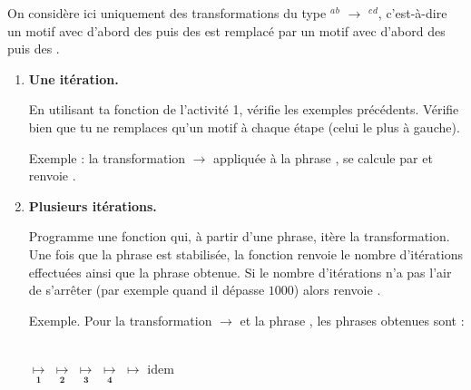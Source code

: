 \documentclass[11pt,class=report,crop=false]{standalone}
\begin{document}

\begin{activite}


On considère ici uniquement des transformations du type \rzero$^a$\run$^b$ $\rightarrow$ \run$^c$\rzero$^d$, c'est-à-dire un motif avec d'abord des \rzero{} puis des \run{} est remplacé par un motif avec d'abord des \run{} puis des \rzero.



\begin{enumerate}
  \item \textbf{Une itération.}
  
   En utilisant ta fonction  de l'activité 1, vérifie les exemples précédents. Vérifie bien que tu ne remplaces qu'un motif à chaque étape (celui le plus à gauche).
  
  Exemple : la transformation \rzero\run{} $\rightarrow$ \run\rzero{} appliquée à la phrase \run\rzero\run, se calcule par  et renvoie .
   
  \item \textbf{Plusieurs itérations.}
  
  
  Programme une fonction  qui, à partir d'une phrase, itère la transformation. Une fois que la phrase est stabilisée, la fonction renvoie le nombre d'itérations effectuées ainsi que la phrase obtenue. Si le nombre d'itérations n'a pas l'air de s'arrêter (par exemple quand il dépasse $1000$) alors renvoie .
  
  Exemple. Pour la transformation \rzero\rzero\run\run{} $\rightarrow$ \run\run\rzero\rzero{} et la phrase \rzero\rzero\rzero\rzero\run\run\rzero\run\run, les phrases obtenues sont : \\
  \\
\centerline{
\rzero\rzero\rzero\rzero\run\run\rzero\run\run{}  $\underset{\mathbf{1}}{\longmapsto}$
\rzero\rzero\run\run\rzero\rzero\rzero\run\run{}  $\underset{\mathbf{2}}{\longmapsto}$
\run\run\rzero\rzero\rzero\rzero\rzero\run\run{}  $\underset{\mathbf{3}}{\longmapsto}$
\run\run\rzero\rzero\rzero\run\run\rzero\rzero{}  $\underset{\mathbf{4}}{\longmapsto}$
\run\run\rzero\run\run\rzero\rzero\rzero\rzero{}  $\longmapsto$
idem
}\\


\end{enumerate}
\end{activite}
\end{document}
